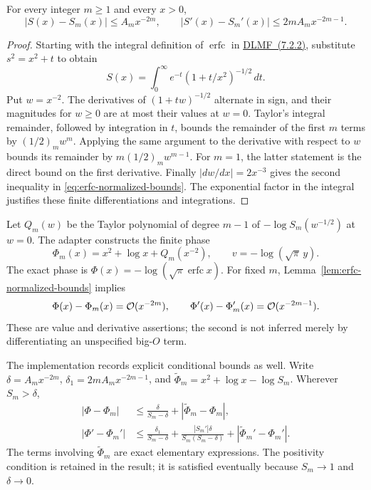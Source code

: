 \begin{lemma}
\label{lem:erfc-normalized-bounds}
For every integer $m\ge1$ and every $x>0$,
\begin{equation}
 |S(x)-S_m(x)|\le A_m x^{-2m},\qquad
 |S'(x)-S_m'(x)|\le 2m A_m x^{-2m-1}.
 \label{eq:erfc-normalized-bounds}
\end{equation}
\end{lemma}
\begin{proof}
Starting with the integral definition of $\operatorname{erfc}$ in
\href{https://dlmf.nist.gov/7.2.E2}{DLMF~(7.2.2)}, substitute
$s^2=x^2+t$ to obtain
\begin{equation}
 S(x)=\int_0^\infty e^{-t}(1+t/x^2)^{-1/2}\,dt.
 \label{eq:erfc-normalized-integral}
\end{equation}
Put $w=x^{-2}$. The derivatives of $(1+tw)^{-1/2}$ alternate in sign, and
their magnitudes for $w\ge0$ are at most their values at $w=0$.
Taylor's integral remainder, followed by integration in $t$, bounds the
remainder of the first $m$ terms by $(1/2)_m w^m$.
Applying the same argument to the derivative with respect to $w$ bounds
its remainder by $m(1/2)_m w^{m-1}$. For $m=1$, the latter statement is
the direct bound on the first derivative. Finally
$|dw/dx|=2x^{-3}$ gives the second inequality in
\eqref{eq:erfc-normalized-bounds}. The exponential factor in the integral
justifies these finite differentiations and integrations.
\end{proof}

Let $Q_m(w)$ be the Taylor polynomial of degree $m-1$ of
$-\log S_m(w^{-1/2})$ at $w=0$. The adapter constructs the finite phase
\begin{equation}
 \Phi_m(x)=x^2+\log x+Q_m(x^{-2}),
 \qquad v=-\log(\sqrt\pi\,y).
 \label{eq:erfc-finite-phase}
\end{equation}
The exact phase is $\Phi(x)=-\log(\sqrt\pi\operatorname{erfc}x)$.
For fixed $m$, Lemma~\ref{lem:erfc-normalized-bounds} implies
\begin{equation}
 \Phi(x)-\Phi_m(x)=\mathcal O(x^{-2m}),\qquad
 \Phi'(x)-\Phi_m'(x)=\mathcal O(x^{-2m-1}).
 \label{eq:erfc-phase-errors}
\end{equation}
These are value and derivative assertions; the second is not inferred
merely by differentiating an unspecified big-$O$ term.

The implementation records explicit conditional bounds as well. Write
$\delta=A_mx^{-2m}$, $\delta_1=2mA_mx^{-2m-1}$, and
$\widetilde\Phi_m=x^2+\log x-\log S_m$. Wherever $S_m>\delta$,
\begin{align}
 |\Phi-\Phi_m|
 &\le\frac{\delta}{S_m-\delta}
       +|\widetilde\Phi_m-\Phi_m|,
       \label{eq:erfc-explicit-phase-bound}\\
 |\Phi'-\Phi_m'|
 &\le\frac{\delta_1}{S_m-\delta}
 +\frac{|S_m'|\delta}{S_m(S_m-\delta)}
 +|\widetilde\Phi_m'-\Phi_m'|.
 \label{eq:erfc-explicit-phase-derivative-bound}
\end{align}
The terms involving $\widetilde\Phi_m$ are exact elementary expressions.
The positivity condition is retained in the result; it is satisfied
eventually because $S_m\to1$ and $\delta\to0$.

